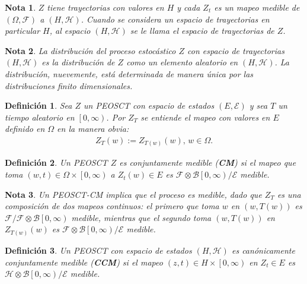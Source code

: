 \documentclass{article}
\newtheorem{Def}{Definición}[section]
\newtheorem{Note}{Nota}[section]
\numberwithin{equation}{section}
\begin{document}
\begin{Note}
$Z$ tiene trayectorias con valores en $H$ y cada $Z_{t}$ es un mapeo medible de $\left(\Omega,\mathcal{F}\right)$ a $\left(H,\mathcal{H}\right)$. Cuando se considera un espacio de trayectorias en particular $H$, al espacio $\left(H,\mathcal{H}\right)$ se le llama el espacio de trayectorias de $Z$.
\end{Note}

\begin{Note}
La distribuci\'on del proceso estoc\'astico $Z$ con espacio de trayectorias $\left(H,\mathcal{H}\right)$ es la distribuci\'on de $Z$ como  un elemento aleatorio en $\left(H,\mathcal{H}\right)$. La distribuci\'on, nuevemente, est\'a determinada de manera \'unica por las distribuciones finito dimensionales.
\end{Note}


\begin{Def}
Sea $Z$ un PEOSCT  con espacio de estados $\left(E,\mathcal{E}\right)$ y sea $T$ un tiempo aleatorio en $\left[0,\infty\right)$. Por $Z_{T}$ se entiende el mapeo con valores en $E$ definido en $\Omega$ en la manera obvia:
\begin{eqnarray}
Z_{T}\left(w\right):=Z_{T\left(w\right)}\left(w\right)\textrm{, }w\in\Omega.
\end{eqnarray}
\end{Def}

\begin{Def}
Un PEOSCT $Z$ es conjuntamente medible (\textbf{CM}) si el mapeo que toma $\left(w,t\right)\in\Omega\times\left[0,\infty\right)$ a $Z_{t}\left(w\right)\in E$ es $\mathcal{F}\otimes\mathcal{B}\left[0,\infty\right)/\mathcal{E}$ medible.
\end{Def}

\begin{Note}
Un PEOSCT-CM implica que el proceso es medible, dado que $Z_{T}$ es una composici\'on  de dos mapeos continuos: el primero que toma $w$ en $\left(w,T\left(w\right)\right)$ es $\mathcal{F}/\mathcal{F}\otimes\mathcal{B}\left[0,\infty\right)$ medible, mientras que el segundo toma $\left(w,T\left(w\right)\right)$ en $Z_{T\left(w\right)}\left(w\right)$ es $\mathcal{F}\otimes\mathcal{B}\left[0,\infty\right)/\mathcal{E}$ medible.
\end{Note}


\begin{Def}
Un PEOSCT con espacio de estados $\left(H,\mathcal{H}\right)$ es can\'onicamente conjuntamente medible (\textbf{CCM}) si el mapeo $\left(z,t\right)\in H\times\left[0,\infty\right)$ en $Z_{t}\in E$ es $\mathcal{H}\otimes\mathcal{B}\left[0,\infty\right)/\mathcal{E}$ medible.
\end{Def}
\end{document}
